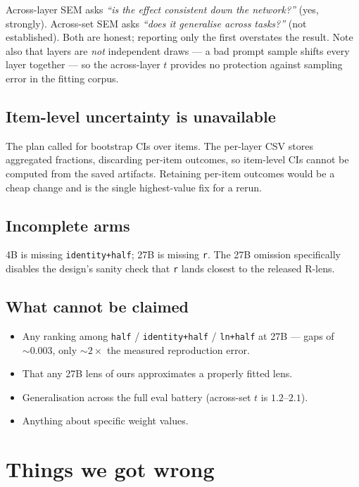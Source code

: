 \documentclass[11pt,a4paper]{article}
\newcommand{\rlens}{R\nobreakdash-lens}
\newcommand{\cfg}[1]{\texttt{#1}}
\begin{document}
\noindent
Across-layer SEM asks \emph{``is the effect consistent down the network?''} (yes,
strongly). Across-set SEM asks \emph{``does it generalise across tasks?''} (not
established). Both are honest; reporting only the first overstates the result. Note
also that layers are \emph{not} independent draws --- a bad prompt sample shifts every
layer together --- so the across-layer $t$ provides no protection against sampling
error in the fitting corpus.

\subsection{Item-level uncertainty is unavailable}

The plan called for bootstrap CIs over items. The per-layer CSV stores aggregated
fractions, discarding per-item outcomes, so item-level CIs cannot be computed from
the saved artifacts. Retaining per-item outcomes would be a cheap change and is the
single highest-value fix for a rerun.

\subsection{Incomplete arms}

4B is missing \cfg{identity+half}; 27B is missing \cfg{r}. The 27B omission
specifically disables the design's sanity check that \cfg{r} lands closest to the
released \rlens.

\subsection{What cannot be claimed}

\begin{itemize}[leftmargin=1.4em]
  \item Any ranking among \cfg{half} / \cfg{identity+half} / \cfg{ln+half} at 27B ---
        gaps of $\sim0.003$, only $\sim2\times$ the measured reproduction error.
  \item That any 27B lens of ours approximates a properly fitted lens.
  \item Generalisation across the full eval battery (across-set $t$ is $1.2$--$2.1$).
  \item Anything about specific weight values.
\end{itemize}

\section{Things we got wrong}
\end{document}
